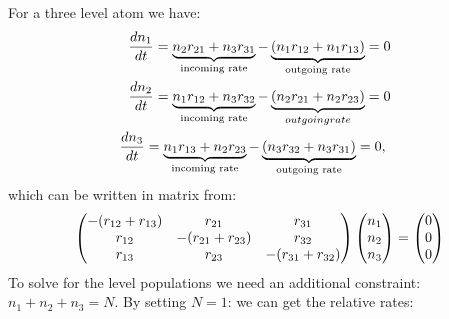 \documentclass[letterpaper,10pt,english]{sphinxmanual}
\begin{document}
For a three level atom we have:
\begin{gather}
\begin{split}\frac{dn_1}{dt} &= \underbrace{n_2 r_{21} + n_3 r_{31}}_\textrm{incoming rate}
                - \underbrace{(n_1 r_{12} + n_1 r_{13})}_\textrm{outgoing rate} = 0\\\end{split}\notag\\\begin{split}\frac{dn_2}{dt} &= \underbrace{n_1 r_{12} + n_3 r_{32}}_\textrm{incoming rate}
                - \underbrace{(n_2 r_{21} + n_2 r_{23})}_{outgoing rate} = 0\\\end{split}\notag\\\begin{split}\frac{dn_3}{dt} &= \underbrace{n_1 r_{13} + n_2 r_{23}}_\textrm{incoming rate}
                - \underbrace{(n_3 r_{32} + n_3 r_{31})}_\textrm{outgoing rate} = 0,\end{split}\notag
\end{gather}
which can be written in matrix from:
\begin{gather}
\begin{split}\left(\begin{matrix}
    -(r_{12} + r_{13}) & r_{21} & r_{31}\\
    r_{12} & -(r_{21} + r_{23}) & r_{32}\\
    r_{13} & r_{23} & -(r_{31} + r_{32}) \\
\end{matrix}\right)
\left(
\begin{matrix}
    n_1\\
    n_2\\
    n_3\\
\end{matrix}
\right)
=
\left(
\begin{matrix}
    0\\
    0\\
    0\\
\end{matrix}
\right)\end{split}\notag
\end{gather}
To solve for the level populations we need an additional constraint: $n_1 + n_2 + n_3 = N$. By setting $N = 1$:
we can get the relative rates:
\end{document}
